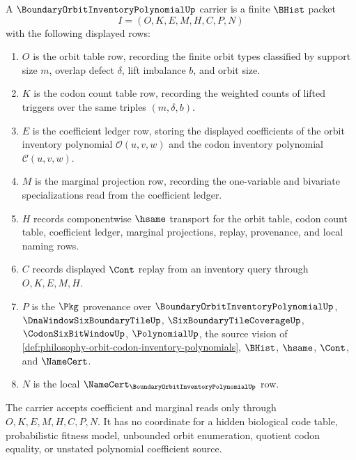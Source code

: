 \begin{definition}
\label{def:boundary-orbit-inventory-polynomial-carrier}
A $\BoundaryOrbitInventoryPolynomialUp$ carrier is a finite $\BHist$ packet
$$
I=(O,K,E,M,H,C,P,N)
$$
with the following displayed rows:
\begin{enumerate}
\item $O$ is the orbit table row, recording the finite orbit types classified by support size $m$, overlap defect $\delta$, lift imbalance $b$, and orbit size.
\item $K$ is the codon count table row, recording the weighted counts of lifted triggers over the same triples $(m,\delta,b)$.
\item $E$ is the coefficient ledger row, storing the displayed coefficients of the orbit inventory polynomial $\mathcal{O}(u,v,w)$ and the codon inventory polynomial $\mathcal{C}(u,v,w)$.
\item $M$ is the marginal projection row, recording the one-variable and bivariate specializations read from the coefficient ledger.
\item $H$ records componentwise $\hsame$ transport for the orbit table, codon count table, coefficient ledger, marginal projections, replay, provenance, and local naming rows.
\item $C$ records displayed $\Cont$ replay from an inventory query through $O,K,E,M,H$.
\item $P$ is the $\Pkg$ provenance over $\BoundaryOrbitInventoryPolynomialUp$, $\DnaWindowSixBoundaryTileUp$, $\SixBoundaryTileCoverageUp$, $\CodonSixBitWindowUp$, $\PolynomialUp$, the source vision of \autoref{def:philosophy-orbit-codon-inventory-polynomials}, $\BHist$, $\hsame$, $\Cont$, and $\NameCert$.
\item $N$ is the local $\NameCert_{\BoundaryOrbitInventoryPolynomialUp}$ row.
\end{enumerate}
The carrier accepts coefficient and marginal reads only through $O,K,E,M,H,C,P,N$. It has no coordinate for a hidden biological code table, probabilistic fitness model, unbounded orbit enumeration, quotient codon equality, or unstated polynomial coefficient source.
\end{definition}

